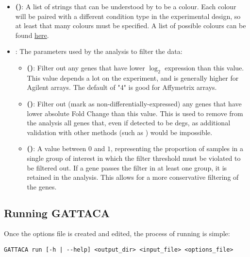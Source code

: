 \begin{itemize}
\begin{itemize}
        \item \textbf{ ()}: A list of strings that can be understood by  to be a colour. Each colour will be paired with a different condition type in the experimental design, so at least that many colours must be specified. A list of possible colours can be found \href{http://www.stat.columbia.edu/~tzheng/files/Rcolor.pdf}{here}.
        \item \textbf{}: The parameters used by the analysis to filter the data:
        \begin{itemize}
            \item \textbf{ ()}: Filter out any genes that have lower $\log_2$ expression than this value. This value depends a lot on the experiment, and is generally higher for Agilent arrays. The default of "4" is good for Affymetrix arrays.
            \item \textbf{ ()}: Filter out (mark as non-differentially-expressed) any genes that have lower absolute Fold Change than this value. This is used to remove from the analysis all genes that, even if detected to be \glspl{deg}, as additional validation with other methods (such as ) would be impossible.
            \item \textbf{ ()}: A value between $0$ and $1$, representing the proportion of samples in a single group of interest in which the  filter threshold must be violated to be filtered out. If a gene passes the filter in at least one group, it is retained in the analysis. This allows for a more conservative filtering of the genes.
        \end{itemize}
    \end{itemize}
\end{itemize}

\subsection{Running GATTACA}
Once the options file is created and edited, the process of running  is simple:
\begin{lstlisting}[style=ShellStyle]
GATTACA run [-h | --help] <output_dir> <input_file> <options_file>
\end{lstlisting}

